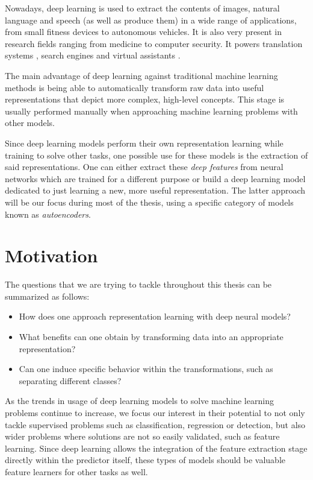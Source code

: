 Nowadays, deep learning is used to extract the contents of images, natural language and speech (as well as produce them) in a wide range of applications, from small fitness devices to autonomous vehicles. It is also very present in research fields ranging from medicine to computer security. It powers translation systems , search engines  and virtual assistants . 

The main advantage of deep learning against traditional machine learning methods is being able to automatically transform raw data into useful representations that depict more complex, high-level concepts. This stage is usually performed manually when approaching machine learning problems with other models.

Since deep learning models perform their own representation learning while training to solve other tasks, one possible use for these models is the extraction of said representations. One can either extract these \textit{deep features} from neural networks which are trained for a different purpose or build a deep learning model dedicated to just learning a new, more useful representation. The latter approach will be our focus during most of the thesis, using a specific category of models known as \textit{autoencoders}.

\section{Motivation}

The questions that we are trying to tackle throughout this thesis can be summarized as follows:

\begin{itemize}
    \item How does one approach representation learning with deep neural models?
    \item What benefits can one obtain by transforming data into an appropriate representation?
    \item Can one induce specific behavior within the transformations, such as separating different classes?
\end{itemize}



As the trends in usage of deep learning models to solve machine learning problems continue to increase, we focus our interest in their potential to not only tackle supervised problems such as classification, regression or detection, but also wider problems where solutions are not so easily validated, such as feature learning. Since deep learning allows the integration of the feature extraction stage directly within the predictor itself, these types of models should be valuable feature learners for other tasks as well.

